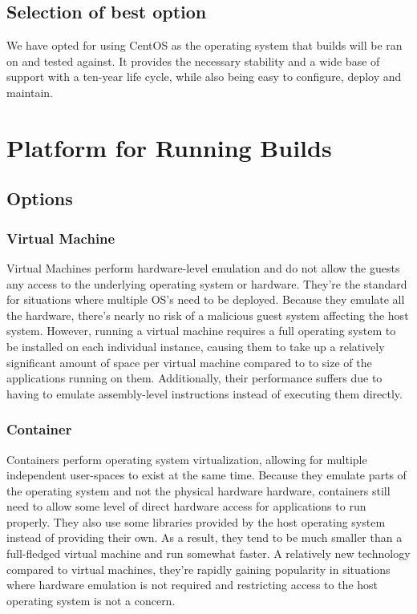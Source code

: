 \documentclass[10pt,letterpaper,onecolumn,journal]{IEEEtran}
\begin{document}
\subsection{Selection of best option}
We have opted for using CentOS as the operating system that builds will be ran on and tested against. It provides the necessary stability and a wide base of support with a ten-year life cycle, while also being easy to configure, deploy and maintain.
\section{Platform for Running Builds}
\subsection{Options}
\subsubsection{Virtual Machine}
Virtual Machines perform hardware-level emulation and do not allow the guests any access to the underlying operating system or hardware. They're the standard for situations where multiple OS's need to be deployed. Because they emulate all the hardware, there's nearly no risk of a malicious guest system affecting the host system. However, running a virtual machine requires a full operating system to be installed on each individual instance, causing them to take up a relatively significant amount of space per virtual machine compared to to size of the applications running on them. Additionally, their performance suffers due to having to emulate assembly-level instructions instead of executing them directly.
\subsubsection{Container}
Containers perform operating system virtualization, allowing for multiple independent user-spaces to exist at the same time. Because they emulate parts of the operating system and not the physical hardware hardware, containers still need to allow some level of direct hardware access for applications to run properly. They also use some libraries provided by the host operating system instead of providing their own. As a result, they tend to be much smaller than a full-fledged virtual machine and run somewhat faster. A relatively new technology compared to virtual machines, they're rapidly gaining popularity in situations where hardware emulation is not required and restricting access to the host operating system is not a concern.
\end{document}

